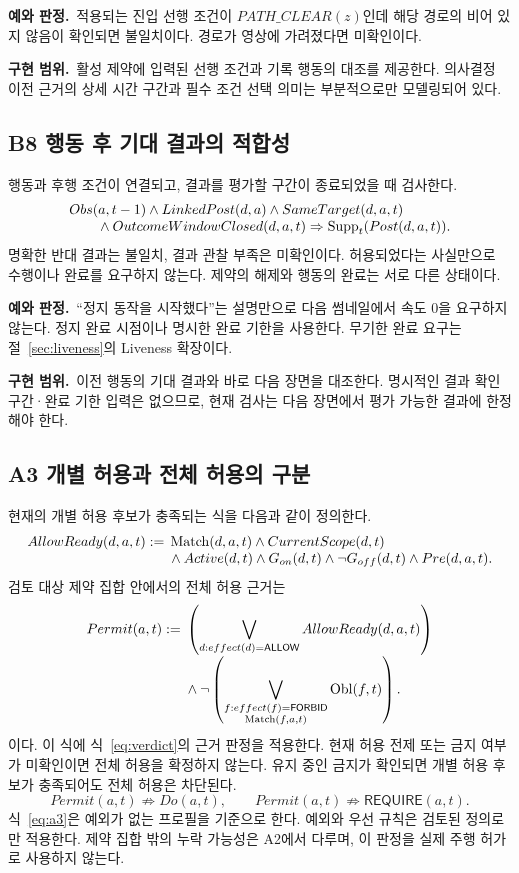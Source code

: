 \documentclass[11pt,a4paper]{article}
\newcommand{\pred}[1]{\mathsf{#1}}
\newcommand{\supp}{\operatorname{Supp}}
\newcommand{\match}{\operatorname{Match}}
\newcommand{\obl}{\operatorname{Obl}}
\newcommand{\example}{\par\textbf{예와 판정.}\ }
\newcommand{\impl}{\par\textbf{구현 범위.}\ }
\begin{document}
\example 적용되는 진입 선행 조건이 $PATH\_CLEAR(z)$인데
해당 경로의 비어 있지 않음이 확인되면 불일치이다.
경로가 영상에 가려졌다면 미확인이다.
\impl 활성 제약에 입력된 선행 조건과 기록 행동의 대조를 제공한다.
의사결정 이전 근거의 상세 시간 구간과 필수 조건 선택 의미는 부분적으로만 모델링되어 있다.

\subsection{B8 행동 후 기대 결과의 적합성}\label{prop:b8}
행동과 후행 조건이 연결되고, 결과를 평가할 구간이 종료되었을 때 검사한다.
\begin{align}
 &Obs(a,t-1)\land LinkedPost(d,a)\land SameTarget(d,a,t)\notag\\[-0.3em]
 &\hspace{2em}\land OutcomeWindowClosed(d,a,t)
 \Rightarrow\supp_t(Post(d,a,t)).\label{eq:b8}
\end{align}
명확한 반대 결과는 불일치, 결과 관찰 부족은 미확인이다.
허용되었다는 사실만으로 수행이나 완료를 요구하지 않는다.
제약의 해제와 행동의 완료는 서로 다른 상태이다.

\example ``정지 동작을 시작했다''는 설명만으로 다음 썸네일에서
속도 0을 요구하지 않는다. 정지 완료 시점이나 명시한 완료 기한을 사용한다.
무기한 완료 요구는 절~\ref{sec:liveness}의 Liveness 확장이다.
\impl 이전 행동의 기대 결과와 바로 다음 장면을 대조한다.
명시적인 결과 확인 구간·완료 기한 입력은 없으므로,
현재 검사는 다음 장면에서 평가 가능한 결과에 한정해야 한다.

\subsection{A3 개별 허용과 전체 허용의 구분}\label{prop:a3}
현재의 개별 허용 후보가 충족되는 식을 다음과 같이 정의한다.
\begin{align}
 AllowReady(d,a,t):={}&\match(d,a,t)\land CurrentScope(d,t)\notag\\[-0.3em]
 &\land Active(d,t)\land G_{on}(d,t)\land\neg G_{off}(d,t)\land Pre(d,a,t).
\end{align}
검토 대상 제약 집합 안에서의 전체 허용 근거는
\begin{align}
 Permit(a,t):={}&
 \left(\bigvee_{d:effect(d)=\pred{ALLOW}}AllowReady(d,a,t)\right)\notag\\[-0.3em]
 &\land\neg\left(
 \bigvee_{\substack{f:effect(f)=\pred{FORBID}\\\match(f,a,t)}}\obl(f,t)
 \right).\label{eq:a3}
\end{align}
이다. 이 식에 식~\eqref{eq:verdict}의 근거 판정을 적용한다.
현재 허용 전제 또는 금지 여부가 미확인이면 전체 허용을 확정하지 않는다.
유지 중인 금지가 확인되면 개별 허용 후보가 충족되어도 전체 허용은 차단된다.
\begin{equation}
 Permit(a,t)\not\Rightarrow Do(a,t),\qquad
 Permit(a,t)\not\Rightarrow\pred{REQUIRE}(a,t).
\end{equation}
식~\eqref{eq:a3}은 예외가 없는 프로필을 기준으로 한다.
예외와 우선 규칙은 검토된 정의로만 적용한다.
제약 집합 밖의 누락 가능성은 A2에서 다루며, 이 판정을 실제 주행 허가로 사용하지 않는다.
\end{document}
